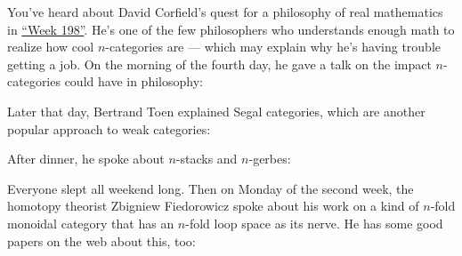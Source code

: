 \documentclass{article}
\def\tightlist{}
\renewcommand{\texttt}[1]{%
  \begingroup
  \ttfamily
  \begingroup\lccode`~=`/\lowercase{\endgroup\def~}{/\discretionary{}{}{}}%
  \begingroup\lccode`~=`[\lowercase{\endgroup\def~}{[\discretionary{}{}{}}%
  \begingroup\lccode`~=`.\lowercase{\endgroup\def~}{.\discretionary{}{}{}}%
  \catcode`/=\active\catcode`[=\active\catcode`.=\active
  \scantokens{#1\noexpand}%
  \endgroup
}
\begin{document}

You've heard about David Corfield's quest for a philosophy of real
mathematics in \protect\hyperlink{week198}{``Week 198''}. He's one of
the few philosophers who understands enough math to realize how cool
\(n\)-categories are --- which may explain why he's having trouble
getting a job. On the morning of the fourth day, he gave a talk on the
impact \(n\)-categories could have in philosophy:


Later that day, Bertrand Toen explained Segal categories, which are
another popular approach to weak categories:


After dinner, he spoke about \(n\)-stacks and \(n\)-gerbes:


Everyone slept all weekend long. Then on Monday of the second week, the
homotopy theorist Zbigniew Fiedorowicz spoke about his work on a kind of
\(n\)-fold monoidal category that has an \(n\)-fold loop space as its
nerve. He has some good papers on the web about this, too:
\end{document}
